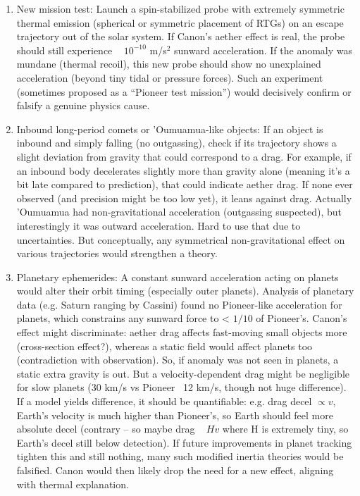 \documentclass[11pt]{article}
\begin{document}
\begin{enumerate}

\item 
New mission test: Launch a spin-stabilized probe with extremely symmetric thermal emission (spherical or symmetric placement of RTGs) on an escape trajectory out of the solar system. If Canon’s aether effect is real, the probe should still experience ~ $10^{-10}$ m/s$^2$ sunward acceleration. If the anomaly was mundane (thermal recoil), this new probe should show no unexplained acceleration (beyond tiny tidal or pressure forces). Such an experiment (sometimes proposed as a “Pioneer test mission”) would decisively confirm or falsify a genuine physics cause.




\item 
Inbound long-period comets or ’Oumuamua-like objects: If an object is inbound and simply falling (no outgassing), check if its trajectory shows a slight deviation from gravity that could correspond to a drag. For example, if an inbound body decelerates slightly more than gravity alone (meaning it’s a bit late compared to prediction), that could indicate aether drag. If none ever observed (and precision might be too low yet), it leans against drag. Actually ’Oumuamua had non-gravitational acceleration (outgassing suspected), but interestingly it was outward acceleration. Hard to use that due to uncertainties. But conceptually, any symmetrical non-gravitational effect on various trajectories would strengthen a theory.




\item 
Planetary ephemerides: A constant sunward acceleration acting on planets would alter their orbit timing (especially outer planets). Analysis of planetary data (e.g. Saturn ranging by Cassini) found no Pioneer-like acceleration for planets, which constrains any sunward force to < $1/10$ of Pioneer’s. Canon’s effect might discriminate: aether drag affects fast-moving small objects more (cross-section effect?), whereas a static field would affect planets too (contradiction with observation). So, if anomaly was not seen in planets, a static extra gravity is out. But a velocity-dependent drag might be negligible for slow planets (30 km/s vs Pioneer ~12 km/s, though not huge difference). If a model yields difference, it should be quantifiable: e.g. drag decel $\propto v$, Earth’s velocity is much higher than Pioneer’s, so Earth should feel more absolute decel (contrary – so maybe drag ~ $Hv$ where H is extremely tiny, so Earth’s decel still below detection). If future improvements in planet tracking tighten this and still nothing, many such modified inertia theories would be falsified. Canon would then likely drop the need for a new effect, aligning with thermal explanation.




\end{enumerate}
\end{document}
